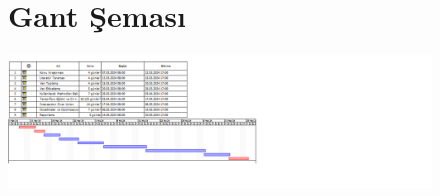 \documentclass[12pt,a4paper]{article}
\begin{document}
\begin{center}
\begin{enumerate}
\begin{enumerate}
				
				
				
					\begin{landscape}
					\begin{figure}
						
						\centering
						\section*{Gant Şeması}
						\includegraphics{gant.png}
						
						\label{fig:gant}
					\end{figure}
				\end{landscape}
				
				
				
				
			\end{enumerate}
		\end{enumerate}
		
	
			
		
		
		
		
		
		
	\end{center}
	
	
	
	
\end{document}
